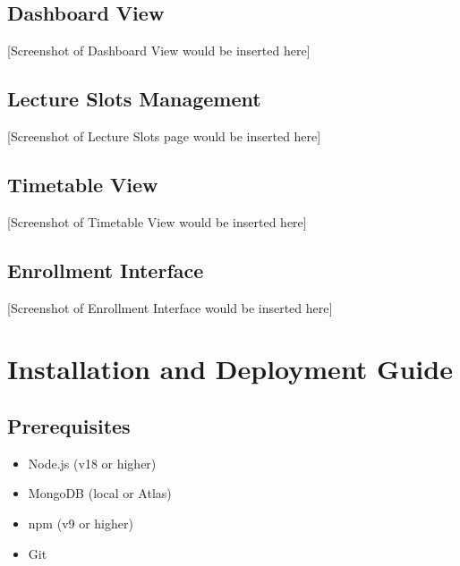 \documentclass[12pt,a4paper]{report}
\begin{document}
\section{Dashboard View}
[Screenshot of Dashboard View would be inserted here]

\section{Lecture Slots Management}
[Screenshot of Lecture Slots page would be inserted here]

\section{Timetable View}
[Screenshot of Timetable View would be inserted here]

\section{Enrollment Interface}
[Screenshot of Enrollment Interface would be inserted here]

\chapter{Installation and Deployment Guide}

\section{Prerequisites}
\begin{itemize}[leftmargin=*]
    \item Node.js (v18 or higher)
    \item MongoDB (local or Atlas)
    \item npm (v9 or higher)
    \item Git
\end{itemize}
\end{document}
